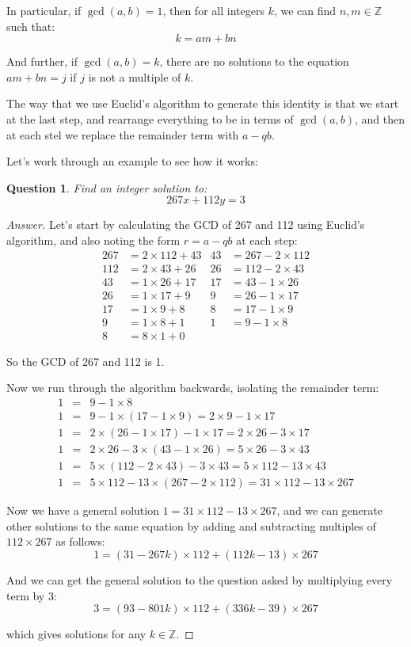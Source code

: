 \documentclass{article}
\newtheorem{question}{Question}
\begin{document}
In particular, if $\gcd(a,b)=1$, then for all integers $k$, we can find $n,m\in \mathbb{Z}$ such that:
\[ k = am + bn \]

And further, if $\gcd(a,b)=k$, there are no solutions to the equation $am+bn=j$ if $j$ is not a
multiple of $k$.

The way that we use Euclid's algorithm to generate this identity is that we start at the last step,
and rearrange everything to be in terms of $\gcd(a,b)$, and then at each stel we replace the remainder
term with $a-qb$.

Let's work through an example to see how it works:

\begin{question}
	Find an integer solution to:
	\[ 267x + 112y = 3 \]
\end{question}
\begin{proof}[Answer]
	Let's start by calculating the GCD of 267 and 112 using Euclid's algorithm, and also
	noting the form $r = a-qb$ at each step:
	\begin{align*}
		267 &= 2 \times 112 + 43 & 43 &= 267 - 2 \times 112 \\
		112 &= 2 \times 43 + 26 & 26 &= 112 - 2 \times 43\\
		43 &= 1 \times 26 + 17 & 17 &= 43 - 1 \times 26 \\
		26 &= 1 \times 17 + 9 & 9 &= 26 - 1 \times 17 \\
		17 &= 1 \times 9 + 8 & 8 &= 17 - 1 \times 9 \\
		9 &= 1 \times 8 + 1 & 1 &= 9 - 1 \times 8 \\
		8 &= 8 \times 1 + 0 &&
	\end{align*}

	So the GCD of 267 and 112 is 1.

	Now we run through the algorithm backwards, isolating the remainder term:
	\begin{eqnarray*}
		1 &=&  9 - 1 \times 8  \\
		1 &=&  9 - 1 \times (17 - 1 \times 9) = 2 \times 9 -1 \times 17  \\
		1 &=&  2 \times (26 - 1 \times 17) - 1 \times 17 = 2 \times 26 - 3 \times 17  \\
		1 &=&  2 \times 26 - 3 \times (43 - 1 \times 26) = 5 \times 26 - 3 \times 43  \\
		1 &=&  5 \times (112 - 2 \times 43) - 3 \times 43 = 5 \times 112 -13 \times 43 \\
		1 &=&  5 \times 112 - 13 \times (267 - 2 \times 112) = 31 \times 112 - 13 \times 267
	\end{eqnarray*}

	Now we have a general solution $1 = 31\times 112 - 13\times 267$, and we can generate other
	solutions to the same equation by adding and subtracting multiples of $112 \times 267$ as follows:
	\[ 1 = (31-267k) \times 112 + (112k - 13) \times 267 \]
	
	And we can get the general solution to the question asked by multiplying every term by 3:
	\[ 3 = (93-801k) \times 112 + (336k - 39) \times 267 \]

	which gives solutions for any $k\in \mathbb{Z}$.

\end{proof}
\end{document}

